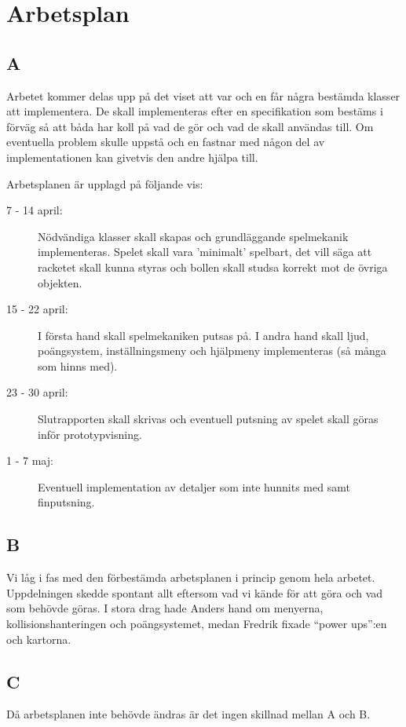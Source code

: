 \documentclass[11pt,a4paper]{article}
\begin{document}
\section{Arbetsplan}

\subsection{A}
Arbetet kommer delas upp på det viset att var och en får några bestämda klasser att implementera. De skall implementeras efter en specifikation som bestäms i förväg så att båda har koll på vad de gör och vad de skall användas till. Om eventuella problem skulle uppstå och en fastnar med någon del av implementationen kan givetvis den andre hjälpa till.

Arbetsplanen är upplagd på följande vis:

\begin{description}
	\item[7 - 14 april:] Nödvändiga klasser skall skapas och grundläggande spelmekanik implementeras. Spelet skall vara 'minimalt' spelbart, det vill säga att racketet skall kunna styras och bollen skall studsa korrekt mot de övriga objekten.
	\item[15 - 22 april:] I första hand skall spelmekaniken putsas på. I andra hand skall ljud, poängsystem, inställningsmeny och hjälpmeny implementeras (så många som hinns med).
	\item[23 - 30 april:] Slutrapporten skall skrivas och eventuell putsning av spelet skall göras inför prototypvisning.
	\item[1 - 7 maj:] Eventuell implementation av detaljer som inte hunnits med samt finputsning.
\end{description}

\subsection{B}
Vi låg i fas med den förbestämda arbetsplanen i princip genom hela arbetet. Uppdelningen skedde spontant allt eftersom vad vi kände för att göra och vad som behövde göras. I stora drag hade Anders hand om menyerna, kollisionshanteringen och poängsystemet, medan Fredrik fixade ``power ups'':en och kartorna.

\subsection{C}
Då arbetsplanen inte behövde ändras är det ingen skillnad mellan A och B.
\end{document}
